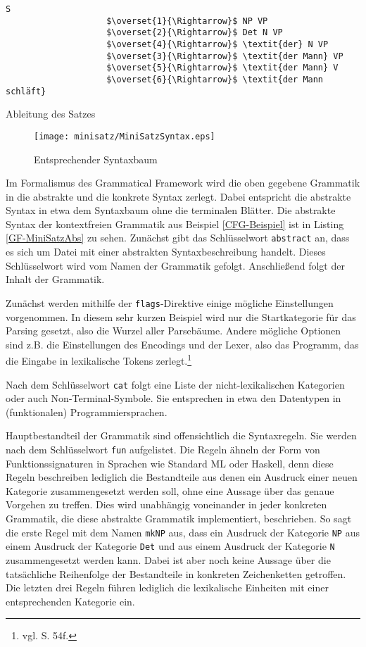 \documentclass[fontsize=12pt,abstract=on,titlepage,bibliography=totoc,ngerman,listof=totoc]{scrreprt}
\begin{document}
\begin{program}[h]
\begin{Verbatim}[commandchars=\\\{\},codes={\catcode`$=3\catcode`^=7}] 
                    S
                    $\overset{1}{\Rightarrow}$ NP VP
                    $\overset{2}{\Rightarrow}$ Det N VP
                    $\overset{4}{\Rightarrow}$ \textit{der} N VP
                    $\overset{3}{\Rightarrow}$ \textit{der Mann} VP
                    $\overset{5}{\Rightarrow}$ \textit{der Mann} V
                    $\overset{6}{\Rightarrow}$ \textit{der Mann schläft}
\end{Verbatim}
\caption{Ableitung des Satzes}
\label{CFG-Ableitung}
\end{program}
\begin{figure}[h]
\texttt{[image: minisatz/MiniSatzSyntax.eps]}
\caption{Entsprechender Syntaxbaum}\label{CFG-Syntaxbaum}
\end{figure}
Im Formalismus des Grammatical Framework wird die oben gegebene Grammatik in die abstrakte und die konkrete Syntax zerlegt.
Dabei entspricht die abstrakte Syntax in etwa dem Syntaxbaum ohne die terminalen Blätter. Die abstrakte Syntax der kontextfreien Grammatik aus Beispiel \ref{CFG-Beispiel} ist in Listing \ref{GF-MiniSatzAbs} zu sehen. Zunächst gibt das Schlüsselwort \texttt{abstract} an, dass es sich um Datei mit einer abstrakten Syntaxbeschreibung handelt. Dieses Schlüsselwort wird vom Namen der Grammatik gefolgt. Anschließend folgt der Inhalt der Grammatik. \par
Zunächst werden mithilfe der \texttt{flags}-Direktive einige mögliche Einstellungen vorgenommen. In diesem sehr kurzen Beispiel wird nur die Startkategorie für das Parsing gesetzt, also die Wurzel aller Parsebäume. Andere mögliche Optionen sind z.B. die Einstellungen des Encodings und der Lexer, also das Programm, das die Eingabe in lexikalische Tokens zerlegt.\footnote{vgl. \cite{RANTA2011} S. 54f.} \par
Nach dem Schlüsselwort \texttt{cat} folgt eine Liste der nicht-lexikalischen Kategorien oder auch Non-Terminal-Symbole. Sie entsprechen in etwa den Datentypen in (funktionalen) Programmiersprachen. \par
Hauptbestandteil der Grammatik sind offensichtlich die Syntaxregeln. Sie werden nach dem Schlüsselwort \texttt{fun} aufgelistet. Die Regeln ähneln der Form von Funktionssignaturen in Sprachen wie Standard ML oder Haskell, denn diese Regeln beschreiben lediglich die Bestandteile aus denen ein Ausdruck einer neuen Kategorie zusammengesetzt werden soll, ohne eine Aussage über das genaue Vorgehen zu treffen. Dies wird unabhängig voneinander in jeder konkreten Grammatik, die diese abstrakte Grammatik implementiert, beschrieben. So sagt die erste Regel mit dem Namen \texttt{mkNP} aus, dass ein Ausdruck der Kategorie \texttt{NP} aus einem Ausdruck der Kategorie \texttt{Det} und aus einem Ausdruck der Kategorie \texttt{N} zusammengesetzt werden kann. Dabei ist aber noch keine Aussage über die tatsächliche Reihenfolge der Bestandteile in konkreten Zeichenketten getroffen. Die letzten drei Regeln führen lediglich die lexikalische Einheiten mit einer entsprechenden Kategorie ein. \par
\end{document}
